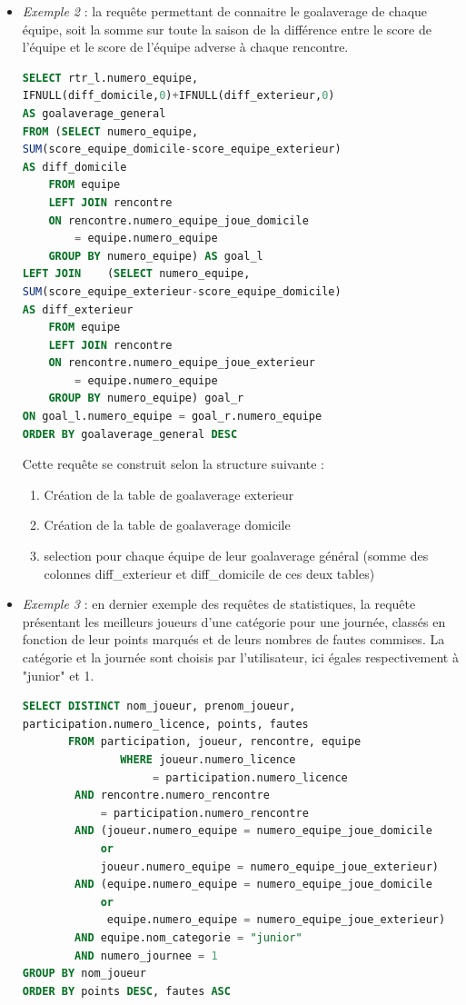 \documentclass[a4paper,12pt]{article}
\begin{document}
\begin{itemize}
\item \textit{Exemple 2} : la requête permettant de connaitre le goalaverage de chaque équipe, soit la somme sur toute la saison de la différence entre le score de l'équipe et le score de l'équipe adverse à chaque rencontre. 
\begin{lstlisting}[language=SQL, caption=Goalaverage de chaque équipe, frame=shadowbox]
SELECT rtr_l.numero_equipe, 
IFNULL(diff_domicile,0)+IFNULL(diff_exterieur,0)
AS goalaverage_general
FROM (SELECT numero_equipe, 
SUM(score_equipe_domicile-score_equipe_exterieur)
AS diff_domicile
    FROM equipe
    LEFT JOIN rencontre
    ON rencontre.numero_equipe_joue_domicile
    	= equipe.numero_equipe
    GROUP BY numero_equipe) AS goal_l
LEFT JOIN    (SELECT numero_equipe, 
SUM(score_equipe_exterieur-score_equipe_domicile)
AS diff_exterieur
    FROM equipe
    LEFT JOIN rencontre
    ON rencontre.numero_equipe_joue_exterieur
    	= equipe.numero_equipe
    GROUP BY numero_equipe) goal_r
ON goal_l.numero_equipe = goal_r.numero_equipe
ORDER BY goalaverage_general DESC
\end{lstlisting}
Cette requête se construit selon la structure suivante :
\begin{enumerate}
\item Création de la table de goalaverage exterieur
\item Création de la table de goalaverage domicile
\item selection pour chaque équipe de leur goalaverage général (somme des colonnes diff\_exterieur et diff\_domicile de ces deux tables)
\end{enumerate}
\item \textit{Exemple 3} : en dernier exemple des requêtes de statistiques, la requête présentant les meilleurs joueurs d'une catégorie pour une journée, classés en fonction de leur points marqués et de leurs nombres de fautes commises. La catégorie et la journée sont choisis par l'utilisateur, ici égales respectivement à "junior" et 1.

\begin{lstlisting}[language=SQL, caption=Goalaverage de chaque équipe, frame=shadowbox]
SELECT DISTINCT nom_joueur, prenom_joueur,
participation.numero_licence, points, fautes
       FROM participation, joueur, rencontre, equipe
               WHERE joueur.numero_licence
               		= participation.numero_licence
        AND rencontre.numero_rencontre 
        	= participation.numero_rencontre
        AND (joueur.numero_equipe = numero_equipe_joue_domicile
        	or
            joueur.numero_equipe = numero_equipe_joue_exterieur)
        AND (equipe.numero_equipe = numero_equipe_joue_domicile 
        	or
             equipe.numero_equipe = numero_equipe_joue_exterieur)
        AND equipe.nom_categorie = "junior"
        AND numero_journee = 1
GROUP BY nom_joueur
ORDER BY points DESC, fautes ASC
\end{lstlisting}
\end{itemize}
 
\end{document}
